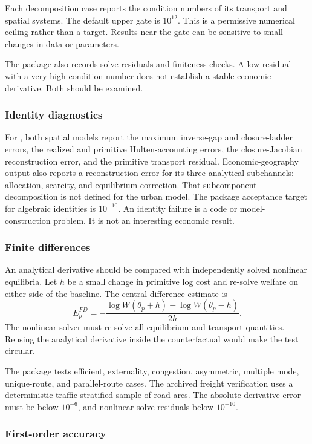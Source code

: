 Each decomposition case reports the condition numbers of its transport and spatial
systems. The default upper gate is \(10^{12}\). This is a permissive numerical
ceiling rather than a target. Results near the gate can be sensitive to small
changes in data or parameters.

The package also records solve residuals and finiteness checks. A low residual
with a very high condition number does not establish a stable economic
derivative. Both should be examined.

\subsubsection{Identity diagnostics}

For , both spatial models report the maximum inverse-gap and
closure-ladder errors, the realized and primitive Hulten-accounting errors, the
closure-Jacobian reconstruction error, and the primitive transport residual.
Economic-geography output also reports a reconstruction error for its three
analytical subchannels: allocation, scarcity, and equilibrium correction.
That subcomponent decomposition is not defined for the urban model.
The package acceptance target for algebraic identities is \(10^{-10}\). An
identity failure is a code or model-construction problem. It is not an
interesting economic result.

\subsubsection{Finite differences}

An analytical derivative should be compared with independently solved
nonlinear equilibria. Let \(h\) be a small change in primitive log cost and
re-solve welfare on either side of the baseline. The central-difference
estimate is
\[
 E_p^{FD}
 =-\frac{\log W(\theta_p+h)-\log W(\theta_p-h)}{2h}.
\]
The nonlinear solver must re-solve all equilibrium and transport quantities.
Reusing the analytical derivative inside the counterfactual would make the
test circular.

The package tests efficient, externality, congestion, asymmetric, multiple
mode, unique-route, and parallel-route cases. The archived freight verification
uses a deterministic traffic-stratified sample of road arcs. The absolute
derivative error must be below \(10^{-6}\), and nonlinear solve residuals below
\(10^{-10}\).

\subsubsection{First-order accuracy}


